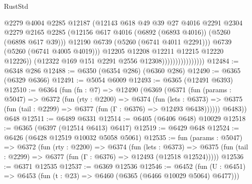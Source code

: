 \begin{lexlean}{RustStd}
\begin{coremodule}
                                        @2279
                                        @4004
                                        @2285
                                        @12187
                                        (@12143
                                          @618
                                          @49
                                          @39
                                          @27
                                          @4016
                                          @2291
                                          @2304
                                          @2279
                                          @2165
                                          @2285
                                          (@12156
                                            @617
                                            @4016
                                            (@6892 (@6893 @4016))
                                            (@5260 (@6898 @617 @39)))
                                          @12190
                                          @6739
                                          (@5260 (@6741 @4011 @2291)))
                                        @6739
                                        (@5260 (@6741 @4005 @4019)))
                                      @12205
                                      @12208
                                      @12211
                                      @12215
                                      @12220
                                      @12226))
                                  (@12322 @169 @151 @2291 @2556 @12308))))))))))))))))
@12484 := @6348 @286
@12488 := @6350 (@6354 @286) (@6360 @286)
@12490 := @6365 (@6329 @6366)
@12491 := @5054 @6009
@12493 := @6365 (@12491 @6393)
@12510 := @6364
    (fun (fn : @7) =>
    @12490
      (@6369
        (@6371
          (fun (params : @5047) =>
          @6372
            (fun (rty : @2200) =>
            @6374
              (fun (lets : @6373) =>
              @6375 (fun (tail : @2299) => @6377 (fun (Γ : @6376) => @12493 @6438))))))
        @6483))
    @648
@12511 := @6489 @6331
@12514 := @6405 (@6406 @648) @10029
@12518 := @6365 (@6397 (@12514 @6413) @6417)
@12519 := @6429 @648
@12524 := @6426 (@6428 @12519 @10032 @5058 @5061)
@12535 := fun (params : @5047) =>
  @6372
    (fun (rty : @2200) =>
    @6374
      (fun (lets : @6373) =>
      @6375 (fun (tail : @2299) => @6377 (fun (Γ : @6376) => @12493 (@12518 @12524)))))
@12536 := @6371 @12535
@12537 := @6369 @12536
@12546 := @6452
    (fun (U : @6451) => @6453 (fun (t : @23) => @6460 (@6365 (@6466 @10029 @5064) @6477)))

\end{coremodule}
\end{lexlean}
